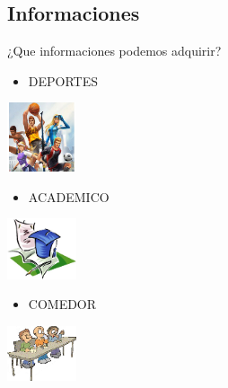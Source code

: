 \documentclass{beamer}
\begin{document}
		\subsection{Informaciones}		
		\begin{frame}{¿Que informaciones podemos adquirir?}
			\begin{itemize}%
				\item
					DEPORTES
			\end{itemize}
			\begin{center}
				\includegraphics[totalheight=0.6in,width=0.8in]{deportes}
			\end{center}
			
			\begin{itemize}%
				\item
					ACADEMICO
			\end{itemize}
			\begin{center}
				\includegraphics[totalheight=0.6in,width=0.8in]{academico}
			\end{center}
			
			\begin{itemize}%
				\item
					COMEDOR
			\end{itemize}
			\begin{center}
				\includegraphics[totalheight=0.6in,width=0.8in]{comedor}
			\end{center}
		\end{frame}
		
\end{document}
